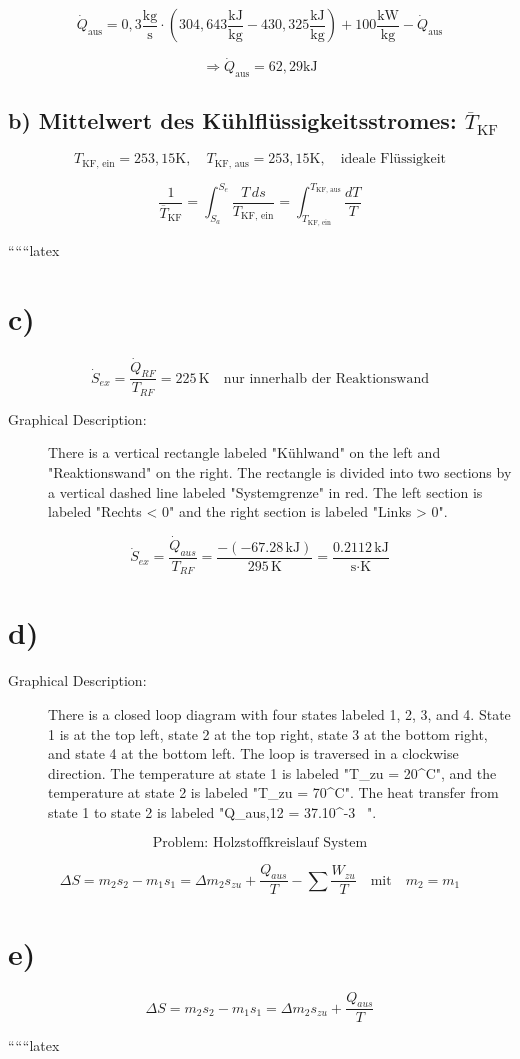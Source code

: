 \[
\dot{Q}_{\text{aus}} = 0,3 \frac{\text{kg}}{\text{s}} \cdot (304,643 \frac{\text{kJ}}{\text{kg}} - 430,325 \frac{\text{kJ}}{\text{kg}}) + 100 \frac{\text{kW}}{\text{kg}} - \dot{Q}_{\text{aus}}
\]

\[
\Rightarrow \dot{Q}_{\text{aus}} = 62,29 \text{kJ}
\]

\subsection*{b) Mittelwert des Kühlflüssigkeitsstromes: $\overline{T}_{\text{KF}}$}

\[
T_{\text{KF, ein}} = 253,15 \text{K}, \quad T_{\text{KF, aus}} = 253,15 \text{K}, \quad \text{ideale Flüssigkeit}
\]

\[
\frac{1}{\overline{T}_{\text{KF}}} = \int_{S_a}^{S_e} \frac{T \, ds}{T_{\text{KF, ein}}} = \int_{T_{\text{KF, ein}}}^{T_{\text{KF, aus}}} \frac{dT}{T}
\]

``````latex


\section*{c)}
\[
\dot{S}_{ex} = \frac{\dot{Q}_{RF}}{T_{RF}} = 225 \, \text{K} \quad \text{nur innerhalb der Reaktionswand}
\]

\begin{description}
    \item[Graphical Description:] 
    There is a vertical rectangle labeled "Kühlwand" on the left and "Reaktionswand" on the right. The rectangle is divided into two sections by a vertical dashed line labeled "Systemgrenze" in red. The left section is labeled "Rechts < 0" and the right section is labeled "Links > 0".
\end{description}

\[
\dot{S}_{ex} = \frac{\dot{Q}_{aus}}{T_{RF}} = \frac{-(-67.28 \, \text{kJ})}{295 \, \text{K}} = \frac{0.2112 \, \text{kJ}}{\text{s} \cdot \text{K}}
\]

\section*{d)}
\begin{description}
    \item[Graphical Description:] 
    There is a closed loop diagram with four states labeled 1, 2, 3, and 4. State 1 is at the top left, state 2 at the top right, state 3 at the bottom right, and state 4 at the bottom left. The loop is traversed in a clockwise direction. The temperature at state 1 is labeled "T_{zu} = 20^\circ C", and the temperature at state 2 is labeled "T_{zu} = 70^\circ C". The heat transfer from state 1 to state 2 is labeled "Q_{aus,12} = 37.10^{-3} \, ".
\end{description}

\[
\text{Problem: Holzstoffkreislauf System}
\]

\[
\Delta S = m_2 s_2 - m_1 s_1 = \Delta m_2 s_{zu} + \frac{Q_{aus}}{T} - \sum \frac{W_{zu}}{T} \quad \text{mit} \quad m_2 = m_1
\]

\section*{e)}
\[
\Delta S = m_2 s_2 - m_1 s_1 = \Delta m_2 s_{zu} + \frac{Q_{aus}}{T}
\]

``````latex



